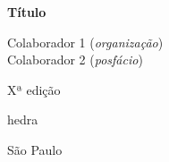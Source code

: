 




\begingroup\thispagestyle{empty}\vspace*{.05\textheight} 

               {\formular
              \huge
              \noindent
              \textbf{Título}\\
              
              \vspace{-0.5cm}
              
              }
            
              \vspace{1cm}
              

              \vfill              

              {\small
              \noindent{} Colaborador 1 (\textit{organização})\vspace{0.2cm}\\
              Colaborador 2 (\textit{posfácio})
              }

              \vspace{0.5cm}

              {\small\noindent{}Xª edição}

              \vfill

              {\newfontfamily{}
              {\noindent\fontsize{30}{40}\selectfont \timesnewroman hedra}}

              {\small\noindent São Paulo \quad\the\year}

\endgroup
\pagebreak
